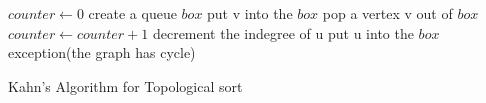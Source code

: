 \begin{algorithm}[H]
    \footnotesize
    \begin{algorithmic}[1]
    \State $counter \gets 0$
    \State create a queue $box$
    \State put v into the $box$
    \EndIf
    \EndFor
    \State pop a vertex v out of $box$
    \State $counter \gets counter+1$
    \State decrement the indegree of u
    \State put u into the $box$
    \EndIf
    \EndFor
    \EndWhile
    \State exception(the graph has cycle)
    \end{algorithmic}
    \caption{Kahn's Algorithm for Topological sort}
    \end{algorithm}